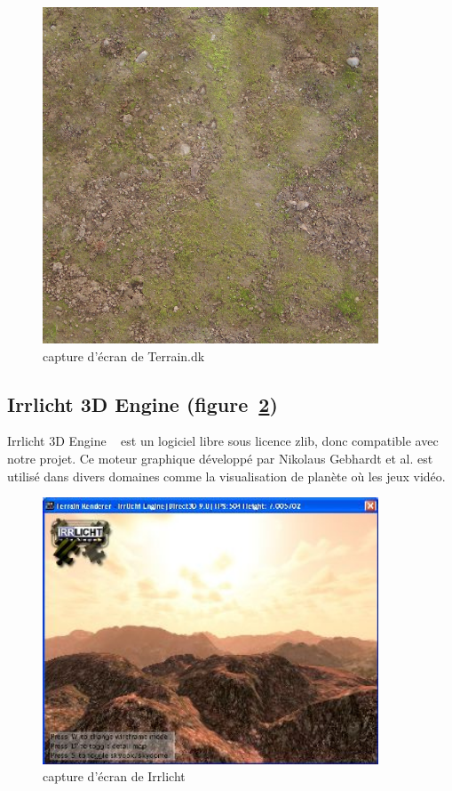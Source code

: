 \begin{figure}[!ht]
    \begin{center}
        \includegraphics[width=10cm]{resources/terraindk.png}
        \caption{capture d'écran de Terrain.dk}
        \label{fig:terrain_dk}
    \end{center}
\end{figure}

\subsection{Irrlicht 3D Engine (figure~\ref{fig:irrlicht})}
Irrlicht 3D Engine ~\cite{irrlicht} est un logiciel libre sous licence zlib, donc compatible avec notre projet. Ce moteur graphique développé par Nikolaus Gebhardt et al. est utilisé dans divers domaines comme la visualisation de planète où les jeux vidéo.
\begin{figure}[!ht]
    \begin{center}
        \includegraphics[width=10cm]{resources/irrlicht.jpg}
        \caption{capture d'écran de Irrlicht}
        \label{fig:irrlicht}
    \end{center}
\end{figure}

